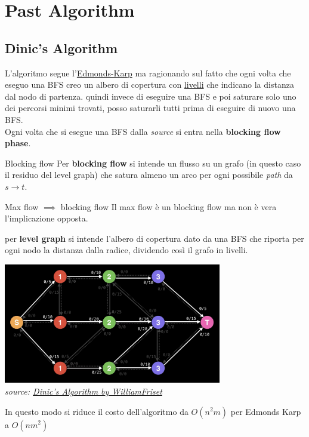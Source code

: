 \documentclass[a4paper, 11pt]{report}
\begin{document}
\newpage

\chapter{Past Algorithm}
\section{Dinic's Algorithm}
\label{dnc}
L'algoritmo segue l'\href{https://en.wikipedia.org/wiki/Edmonds%E2%80%93Karp_algorithm}{Edmonds-Karp} ma ragionando sul fatto che ogni volta che eseguo una BFS creo un albero di copertura con \underline{livelli} che indicano la distanza dal nodo di partenza.
quindi invece di eseguire una BFS e poi saturare solo uno dei percorsi minimi trovati, posso saturarli tutti prima di eseguire di nuovo una BFS.\\
Ogni volta che si esegue una BFS dalla \textit{source} si entra nella \textbf{blocking flow phase}.\\
\begin{definition}{Blocking flow}{}
    Per \textbf{blocking flow} si intende un flusso su un grafo (in questo caso il residuo del level graph) che satura almeno un arco per ogni possibile \textit{path} da $s\rightarrow t$.    
\end{definition}
\begin{obs}{Max flow $\implies$ blocking flow}{}
    Il max flow è un blocking flow ma non è vera l'implicazione opposta.
\end{obs}
per \textbf{level graph} si intende l'albero di copertura dato da una BFS che riporta per ogni nodo la distanza dalla radice, dividendo così il grafo in livelli.
\begin{center}
    \includegraphics[height=5.25cm]{images/levelGraph.png}\\
    \textit{source: \href{https://www.youtube.com/watch?v=M6cm8UeeziI&t=2s}{Dinic's Algorithm by WilliamFriset}}
\end{center}
In questo modo si riduce il costo dell'algoritmo da $O(n^2m)$ per Edmonds Karp a $O(nm^2)$
\end{document}
